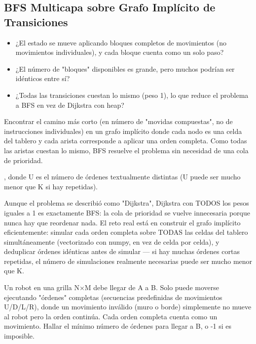 \subsection{BFS Multicapa sobre Grafo Implícito de Transiciones}


\begin{itemize}
\item ¿El estado se mueve aplicando bloques completos de movimientos (no movimientos individuales), y cada bloque cuenta como un solo paso?
\item ¿El número de "bloques" disponibles es grande, pero muchos podrían ser idénticos entre sí?
\item ¿Todas las transiciones cuestan lo mismo (peso 1), lo que reduce el problema a BFS en vez de Dijkstra con heap?
\end{itemize}

 Encontrar el camino más corto (en número de "movidas compuestas", no de instrucciones individuales) en un grafo implícito donde cada nodo es una celda del tablero y cada arista corresponde a aplicar una orden completa. Como todas las aristas cuestan lo mismo, BFS resuelve el problema sin necesidad de una cola de prioridad.

 , donde U es el número de órdenes textualmente distintas (U puede ser mucho menor que K si hay repetidas).

 Aunque el problema se describió como "Dijkstra", Dijkstra con TODOS los pesos iguales a 1 es exactamente BFS: la cola de prioridad se vuelve innecesaria porque nunca hay que reordenar nada. El reto real está en construir el grafo implícito eficientemente: simular cada orden completa sobre TODAS las celdas del tablero simultáneamente (vectorizado con numpy, en vez de celda por celda), y deduplicar órdenes idénticas antes de simular — si hay muchas órdenes cortas repetidas, el número de simulaciones realmente necesarias puede ser mucho menor que K.


Un robot en una grilla N×M debe llegar de A a B. Solo puede moverse ejecutando "órdenes" completas (secuencias predefinidas de movimientos U/D/L/R), donde un movimiento inválido (muro o borde) simplemente no mueve al robot pero la orden continúa. Cada orden completa cuenta como un movimiento. Hallar el mínimo número de órdenes para llegar a B, o -1 si es imposible.

